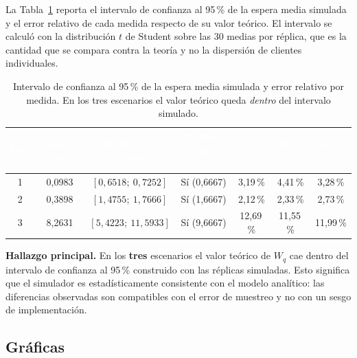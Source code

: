 \documentclass[11pt,a4paper]{article}
\renewcommand{\arraystretch}{1.08}
\begin{document}
La Tabla~\ref{tab:intervalos} reporta el intervalo de confianza al 95\,\% de la espera
media simulada y el error relativo de cada medida respecto de su valor teórico. El
intervalo se calculó con la distribución $t$ de Student sobre las 30 medias por réplica,
que es la cantidad que se compara contra la teoría y no la dispersión de clientes
individuales.

\begin{table}[h!]
\centering
\setlength{\arrayrulewidth}{0.75pt}
\renewcommand{\arraystretch}{1.3}
\small
\begin{tabular}{|c|c|c|c|c|c|c|}
\hline
\rowcolor{headerblue}
\textbf{\textcolor{white}{Esc.}} &
\textbf{\textcolor{white}{Desv. est.}} &
\makecell{\textbf{\textcolor{white}{IC 95\,\% de}} \\ \textbf{\textcolor{white}{la espera}}} &
\makecell{\textbf{\textcolor{white}{\textquestiondown{}Contiene}} \\ \textbf{\textcolor{white}{al teórico?}}} &
\textbf{\textcolor{white}{Err. $L$}} &
\textbf{\textcolor{white}{Err. $L_q$}} &
\textbf{\textcolor{white}{Err. $W_q$}} \\ \hline
1 & 0{,}0983 & $[0{,}6518;\ 0{,}7252]$ & Sí (0{,}6667) & 3{,}19\,\% & 4{,}41\,\% & 3{,}28\,\% \\ \hline
\rowcolor{rowlight}
2 & 0{,}3898 & $[1{,}4755;\ 1{,}7666]$ & Sí (1{,}6667) & 2{,}12\,\% & 2{,}33\,\% & 2{,}73\,\% \\ \hline
3 & 8{,}2631 & $[5{,}4223;\ 11{,}5933]$ & Sí (9{,}6667) & 12{,}69\,\% & 11{,}55\,\% & 11{,}99\,\% \\ \hline
\end{tabular}
\caption{Intervalo de confianza al 95\,\% de la espera media simulada y error relativo
por medida. En los tres escenarios el valor teórico queda \emph{dentro} del intervalo
simulado.}
\label{tab:intervalos}
\end{table}

\noindent\textbf{Hallazgo principal.} En los \textbf{tres} escenarios el valor teórico
de $W_q$ cae dentro del intervalo de confianza al 95\,\% construido con las réplicas
simuladas. Esto significa que el simulador es estadísticamente consistente con el
modelo analítico: las diferencias observadas son compatibles con el error de muestreo y
no con un sesgo de implementación.

\subsection{Gráficas}
\end{document}
